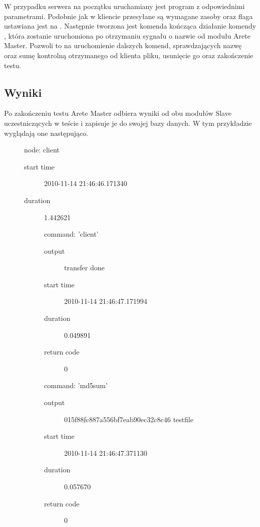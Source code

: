 \documentclass[00-praca-magisterska.tex]{subfiles}
\begin{document}
W przypadku serwera na początku uruchamiany jest program  z
odpowiednimi parametrami. Podobnie jak w kliencie przesyłane są wymagane zasoby
oraz flaga  ustawiana jest na . Następnie
tworzona jest komenda kończąca działanie komendy , która zostanie
uruchomiona po otrzymaniu sygnału o nazwie  od modułu Arete
Master. Pozwoli to na uruchomienie dalszych komend, sprawdzających nazwę oraz
sumę kontrolną otrzymanego od klienta pliku, usunięcie go oraz zakończenie
testu.

\subsection{Wyniki}

Po zakończeniu testu Arete Master odbiera wyniki od obu modułów Slave
uczestniczących w teście i zapisuje je do swojej bazy danych. W tym przykładzie
wyglądają one następująco.

\begin{description}
\item[]
  node: client
  \begin{description}
  \item[start time] 2010-11-14 21:46:46.171340
  \item[duration] 1.442621
  \item[]
    command: 'client'
    \begin{description}
      \item[output] transfer done
      \item[start time] 2010-11-14 21:46:47.171994
      \item[duration] 0.049891
      \item[return code] 0
    \end{description}
  \item[]
    command: 'md5sum'
    \begin{description}
      \item[output] 015f88fc887a556bf7eab90ec32c8c46  testfile
      \item[start time] 2010-11-14 21:46:47.371130
      \item[duration] 0.057670
      \item[return code] 0
    \end{description}
  \end{description}
\end{description}
\end{document}

